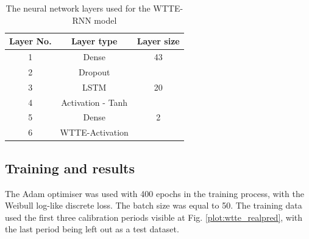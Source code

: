 \begin{table}[h]
\begin{center}
\begin{tabular}{ |c|c|c| }
\hline
Layer No. & Layer type & Layer size\\
\hline
1 & Dense & 43\\
2 & Dropout & \\
3 & LSTM & 20\\
4 & Activation - Tanh & \\
5 & Dense & 2\\
6 & WTTE-Activation & \\
\hline
\end{tabular}
\caption{\label{tab:network}The neural network layers used for the WTTE-RNN model}
\end{center}
\end{table}


\subsection{Training and results}

The Adam optimiser was used with 400 epochs in the training process, with the Weibull log-like discrete loss. The batch size was equal to 50.
The training data used the first three calibration periods visible at Fig. \ref{plot:wtte_realpred}, with the last period being left out as a test dataset.



